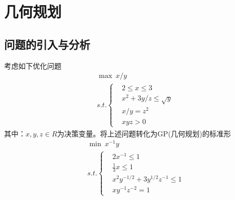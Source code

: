 
\chapter{几何规划}
\section{问题的引入与分析}
    \par
    考虑如下优化问题
    \begin{align*}
    &\mathop{\max}\  x/y\\
    &s.t.  \left\{
    \begin{aligned}
    &2\leqslant x\leqslant 3\\
    &x^2+3y/z\leqslant \sqrt{y}\\
    &x/y=z^2\\
    &xyz>0
    \end{aligned}
        \right.
    \end{align*}
    其中：$x,y,z\in R$为决策变量。将上述问题转化为GP(几何规划)的标准形
    \begin{align*}
    &\mathop{\min}\  x^{-1}y\\
    &s.t.  \left\{
    \begin{aligned}
    &2x^{-1}\leqslant 1\\
    &\frac 13 x\leqslant 1\\
    &x^2y^{-1/2}+3y^{1/2}z^{-1}\leqslant 1\\
    &xy^{-1}z^{-2}=1
    \end{aligned}
    \right.
    \end{align*}
